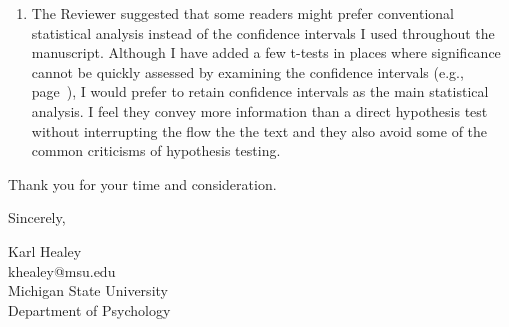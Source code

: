 \documentclass[12pt]{article}
\begin{document}
\begin{enumerate}
	\item
	The Reviewer suggested that some readers might prefer conventional statistical analysis instead of the confidence intervals I used throughout the manuscript. Although I have added a few t-tests in places where significance cannot be quickly assessed by examining the confidence intervals (e.g., page~\pageref{t1}), I would prefer to retain confidence intervals as the main statistical analysis. I feel they convey more information than a direct hypothesis test without interrupting the flow the the text and they also avoid some of the common criticisms of hypothesis testing.

\end{enumerate}



\vspace{20pt}

Thank you for your time and consideration.

\vspace{10pt}

Sincerely,

\vspace{10pt}

Karl Healey\\
khealey@msu.edu\\
Michigan State University\\
Department of Psychology


\end{document}
